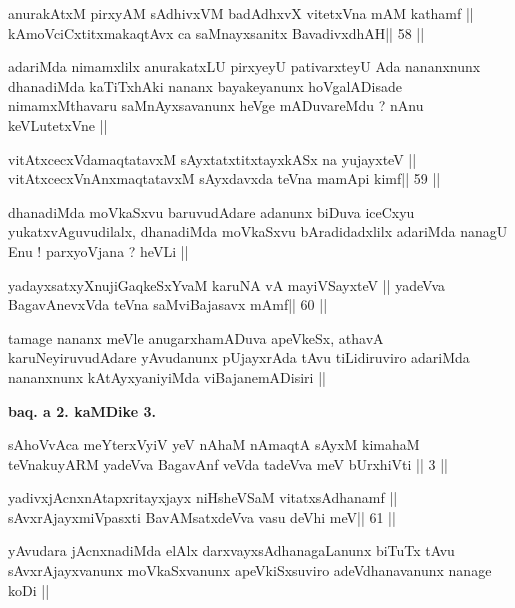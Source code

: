 \begin{shl}
anurakAtxM pirxyAM sAdhivxVM badAdhxvX vitetxVna mAM kathamf ||
kAmoVciCxtitxmakaqtAvx ca saMnayxsanitx BavadivxdhAH\hfill || 58 ||
\end{shl}

\begin{artha}
adariMda nimamxlilx anurakatxLU pirxyeyU pativarxteyU Ada nananxnunx
dhanadiMda kaTiTxhAki nananx bayakeyanunx hoVgalADisade nimamxMthavaru
saMnAyxsavanunx heVge mADuvareMdu ? nAnu keVLutetxVne ||
\end{artha}

\begin{shl}
vitAtxcecxVdamaqtatavxM sAyxtatxtitxtayxkASx na yujayxteV ||
vitAtxcecxVnAnxmaqtatavxM sAyxdavxda teVna mamApi kimf\hfill || 59 ||
\end{shl}

\begin{artha}
dhanadiMda moVkaSxvu baruvudAdare adanunx biDuva iceCxyu
yukatxvAguvudilalx, dhanadiMda moVkaSxvu bAradidadxlilx adariMda
nanagU Enu ! parxyoVjana ? heVLi ||
\end{artha}

\begin{shl}
yadayxsatxyXnujiGaqkeSxYvaM karuNA vA mayiVSayxteV ||
yadeVva BagavAnevxVda teVna saMviBajasavx mAmf\hfill || 60 ||
\end{shl}

\begin{artha}
tamage nananx meVle anugarxhamADuva apeVkeSx, athavA
karuNeyiruvudAdare yAvudanunx pUjayxrAda tAvu tiLidiruviro adariMda
nananxnunx kAtAyxyaniyiMda viBajanemADisiri ||
\end{artha}

\begin{center}
\textbf{baq. a 2. kaMDike 3.}
\end{center}

\begin{artha}
sAhoVvAca meYterxVyiV yeV nAhaM nAmaqtA sAyxM kimahaM teVnakuyARM
yadeVva BagavAnf veVda tadeVva meV bUrxhiVti || 3 ||
\end{artha}

\begin{shl}
yadivxjAcnxnAtapxritayxjayx niHsheVSaM vitatxsAdhanamf ||
sAvxrAjayxmiVpasxti BavAMsatxdeVva vasu deVhi meV\hfill || 61 ||
\end{shl}

\begin{artha}
yAvudara jAcnxnadiMda elAlx darxvayxsAdhanagaLanunx biTuTx tAvu
sAvxrAjayxvanunx moVkaSxvanunx apeVkiSxsuviro adeVdhanavanunx nanage
koDi ||
\end{artha}

